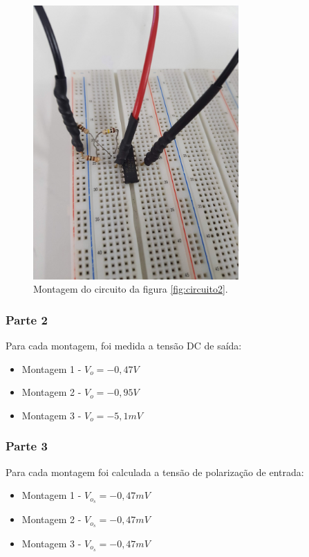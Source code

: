 \documentclass{abntex2}
\begin{document}
\begin{figure}[h]
  \centering
  \includegraphics[width = 0.7\textwidth]{circ_1.jpg}
  \caption{Montagem do circuito da figura \ref{fig:circuito2}.}
  \label{fig:montagem2}
\end{figure}

\subsubsection{Parte 2}
Para cada montagem, foi medida a tensão DC de saída:
\begin{itemize}
  \item Montagem 1 - $V_o = -0,47V$
  \item Montagem 2 - $V_o = -0,95V$
  \item Montagem 3 - $V_o = -5,1mV$
\end{itemize}
\subsubsection{Parte 3}
Para cada montagem foi calculada a tensão de polarização de entrada:

\begin{itemize}
  \item Montagem 1 - $V_o_s = -0,47mV$
  \item Montagem 2 - $V_o_s = -0,47mV$
  \item Montagem 3 - $V_o_s = -0,47mV$
\end{itemize}
\end{document}
